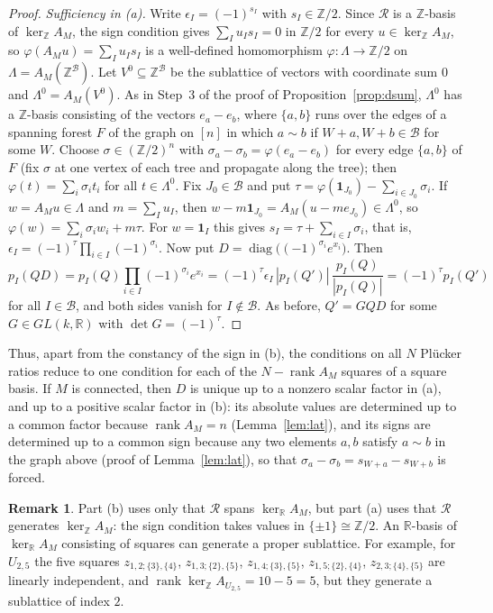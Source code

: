 \documentclass[11pt,a4paper]{article}
\theoremstyle{plain}
\theoremstyle{definition}
\newtheorem{remark}[theorem]{Remark}
\newcommand{\R}{\mathbb R}
\newcommand{\Z}{\mathbb Z}
\newcommand{\AM}{A_M}
\newcommand{\kerZ}{\ker_{\Z}\!A_M}
\newcommand{\kerR}{\ker_{\R}\!A_M}
\newcommand{\bs}{\mathcal B}
\newcommand{\rank}{\operatorname{rank}}
\newcommand{\ind}{\mathbf 1}
\begin{document}
\begin{proof}
\emph{Sufficiency in (a).} Write $\epsilon_I=(-1)^{s_I}$ with $s_I\in\Z/2$. Since $\mathcal R$ is a $\Z$-basis of $\kerZ$, the sign condition gives $\sum_I u_Is_I=0$ in $\Z/2$ for every $u\in\kerZ$, so $\varphi(\AM u)=\sum_I u_Is_I$ is a well-defined homomorphism $\varphi:\Lambda\to\Z/2$ on $\Lambda=\AM(\Z^{\bs})$. Let $V^0\subseteq\Z^{\bs}$ be the sublattice of vectors with coordinate sum $0$ and $\Lambda^0=\AM(V^0)$. As in Step~3 of the proof of Proposition~\ref{prop:dsum}, $\Lambda^0$ has a $\Z$-basis consisting of the vectors $e_a-e_b$, where $\{a,b\}$ runs over the edges of a spanning forest $F$ of the graph on $[n]$ in which $a\sim b$ if $W+a,W+b\in\bs$ for some $W$. Choose $\sigma\in(\Z/2)^n$ with $\sigma_a-\sigma_b=\varphi(e_a-e_b)$ for every edge $\{a,b\}$ of $F$ (fix $\sigma$ at one vertex of each tree and propagate along the tree); then $\varphi(t)=\sum_i\sigma_it_i$ for all $t\in\Lambda^0$. Fix $J_0\in\bs$ and put $\tau=\varphi(\ind_{J_0})-\sum_{i\in J_0}\sigma_i$. If $w=\AM u\in\Lambda$ and $m=\sum_Iu_I$, then $w-m\ind_{J_0}=\AM(u-me_{J_0})\in\Lambda^0$, so $\varphi(w)=\sum_i\sigma_iw_i+m\tau$. For $w=\ind_I$ this gives $s_I=\tau+\sum_{i\in I}\sigma_i$, that is, $\epsilon_I=(-1)^{\tau}\prod_{i\in I}(-1)^{\sigma_i}$. Now put $D=\operatorname{diag}\big((-1)^{\sigma_i}e^{x_i}\big)$. Then
\[
p_I(QD)=p_I(Q)\prod_{i\in I}(-1)^{\sigma_i}e^{x_i}=(-1)^{\tau}\epsilon_I\,|p_I(Q')|\,\frac{p_I(Q)}{|p_I(Q)|}=(-1)^{\tau}p_I(Q')
\]
for all $I\in\bs$, and both sides vanish for $I\notin\bs$. As before, $Q'=GQD$ for some $G\in GL(k,\R)$ with $\det G=(-1)^{\tau}$.
\end{proof}

Thus, apart from the constancy of the sign in (b), the conditions on all $N$ Pl\"ucker ratios reduce to one condition for each of the $N-\rank\AM$ squares of a square basis. If $M$ is connected, then $D$ is unique up to a nonzero scalar factor in (a), and up to a positive scalar factor in (b): its absolute values are determined up to a common factor because $\rank\AM=n$ (Lemma~\ref{lem:lat}), and its signs are determined up to a common sign because any two elements $a,b$ satisfy $a\sim b$ in the graph above (proof of Lemma~\ref{lem:lat}), so that $\sigma_a-\sigma_b=s_{W+a}-s_{W+b}$ is forced.

\begin{remark}\label{rem:index}
Part (b) uses only that $\mathcal R$ spans $\kerR$, but part (a) uses that $\mathcal R$ generates $\kerZ$: the sign condition takes values in $\{\pm1\}\cong\Z/2$. An $\R$-basis of $\kerR$ consisting of squares can generate a proper sublattice. For example, for $U_{2,5}$ the five squares $z_{1,2;\{3\},\{4\}}$, $z_{1,3;\{2\},\{5\}}$, $z_{1,4;\{3\},\{5\}}$, $z_{1,5;\{2\},\{4\}}$, $z_{2,3;\{4\},\{5\}}$ are linearly independent, and $\rank\ker_\Z A_{U_{2,5}}=10-5=5$, but they generate a sublattice of index $2$.
\end{remark}
\end{document}

